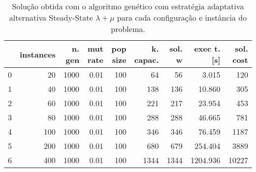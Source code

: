 \begin{table}[H]
\centering
\begin{tabular}{lrrrrrrrr}
\toprule
{} &  instances &  n. gen &  mut rate &  pop size &  k. capac. &  sol. w &  exec t. [s] &  sol. cost \\
\midrule
0 &         20 &    1000 &      0.01 &       100 &         64 &      56 &        3.015 &        120 \\
1 &         40 &    1000 &      0.01 &       100 &        138 &     136 &       10.860 &        305 \\
2 &         60 &    1000 &      0.01 &       100 &        221 &     217 &       23.954 &        453 \\
3 &         80 &    1000 &      0.01 &       100 &        288 &     288 &       46.665 &        781 \\
4 &        100 &    1000 &      0.01 &       100 &        346 &     346 &       76.459 &       1187 \\
5 &        200 &    1000 &      0.01 &       100 &        680 &     679 &      254.404 &       3889 \\
6 &        400 &    1000 &      0.01 &       100 &       1344 &    1344 &     1204.936 &      10227 \\
\bottomrule
\end{tabular}
\caption{Solução obtida com o algoritmo genético com estratégia adaptativa alternativa Steady-State $\lambda + \mu$ para cada configuração e instância do problema.}
\label{table:result-steady}
\end{table}